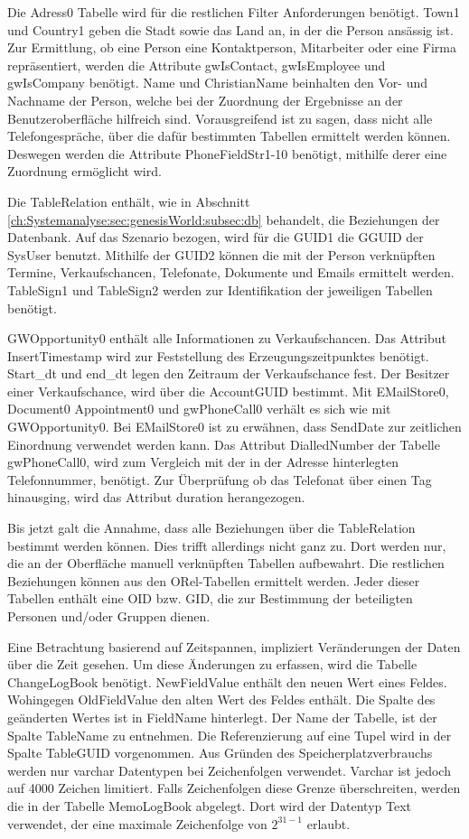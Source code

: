 Die Adress0 Tabelle wird für die restlichen Filter Anforderungen benötigt. Town1 und Country1 geben die Stadt sowie das Land an, in der die Person ansässig ist. Zur Ermittlung, ob eine Person eine Kontaktperson, Mitarbeiter oder eine Firma repräsentiert, werden die Attribute gwIsContact, gwIsEmployee und gwIsCompany benötigt. Name und ChristianName beinhalten den Vor- und Nachname der Person, welche bei der Zuordnung der Ergebnisse an der Benutzeroberfläche hilfreich sind. Vorausgreifend ist zu sagen, dass nicht alle Telefongespräche, über die dafür bestimmten Tabellen ermittelt werden können. Deswegen werden die Attribute PhoneFieldStr1-10 benötigt, mithilfe derer eine Zuordnung ermöglicht wird. 

Die TableRelation enthält, wie in Abschnitt \ref{ch:Systemanalyse:sec:genesisWorld:subsec:db} behandelt, die Beziehungen der Datenbank. Auf das Szenario bezogen, wird für die GUID1 die GGUID der SysUser benutzt. Mithilfe der GUID2 können die mit der Person verknüpften Termine, Verkaufschancen, Telefonate, Dokumente und Emails ermittelt werden. TableSign1 und TableSign2 werden zur Identifikation der jeweiligen Tabellen benötigt.

GWOpportunity0 enthält alle Informationen zu Verkaufschancen. Das Attribut InsertTimestamp wird zur Feststellung des Erzeugungszeitpunktes benötigt. Start\_dt und end\_dt legen den Zeitraum der Verkaufschance fest. Der Besitzer einer Verkaufschance, wird über die AccountGUID bestimmt. Mit EMailStore0, Document0 Appointment0 und gwPhoneCall0 verhält es sich wie mit GWOpportunity0. Bei EMailStore0 ist zu erwähnen, dass SendDate zur zeitlichen Einordnung verwendet werden kann. Das Attribut DialledNumber der Tabelle gwPhoneCall0, wird zum Vergleich  mit der in der Adresse hinterlegten Telefonnummer, benötigt. Zur Überprüfung ob das Telefonat über einen Tag hinausging, wird das Attribut duration herangezogen.

Bis jetzt galt die Annahme, dass alle Beziehungen über die TableRelation bestimmt werden können. Dies trifft allerdings nicht ganz zu. Dort werden nur, die an der Oberfläche manuell verknüpften Tabellen aufbewahrt. Die restlichen Beziehungen können aus den ORel-Tabellen ermittelt werden. Jeder dieser Tabellen enthält eine OID bzw. GID, die zur Bestimmung der beteiligten Personen und/oder Gruppen dienen.

Eine Betrachtung basierend auf Zeitspannen, impliziert Veränderungen der Daten über die Zeit gesehen. Um diese Änderungen zu erfassen, wird die Tabelle ChangeLogBook benötigt. NewFieldValue enthält den neuen Wert eines Feldes. Wohingegen OldFieldValue den alten Wert des Feldes enthält. Die Spalte des geänderten Wertes ist in FieldName hinterlegt. Der Name der Tabelle, ist der Spalte TableName zu entnehmen. Die Referenzierung auf eine Tupel wird in der Spalte TableGUID vorgenommen. Aus Gründen des Speicherplatzverbrauchs werden nur varchar Datentypen bei Zeichenfolgen verwendet. Varchar ist jedoch auf 4000 Zeichen limitiert. Falls Zeichenfolgen diese Grenze überschreiten, werden die in der Tabelle MemoLogBook abgelegt. Dort wird der Datentyp Text verwendet, der eine maximale Zeichenfolge von $2^{31-1}$  erlaubt.